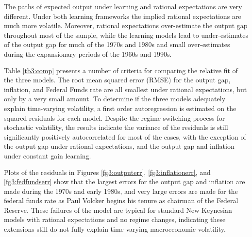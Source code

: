 The paths of expected output under learning and rational expectations are very different.  Under both learning frameworks the implied rational expectations are much more volatile.  Moreover, rational expectations over-estimate the output gap throughout most of the sample, while the learning models lead to under-estimates of the output gap for much of the 1970s and 1980s and small over-estimates during the expansionary periods of the 1960s and 1990s.

Table \ref{tb3:comp} presents a number of criteria for comparing the relative fit of the three models.  The root mean squared error (RMSE) for the output gap, inflation, and Federal Funds rate are all smallest under rational expectations, but only by a very small amount.  To determine if the three models adequately explain time-varying volatility, a first order autoregression is estimated on the squared residuals for each model.  Despite the regime switching process for stochastic volatility, the results indicate the variance of the residuals is still significantly positively autocorrelated for most of the cases, with the exception of the output gap under rational expectations, and the output gap and inflation under constant gain learning.

Plots of the residuals in Figures \ref{fg3:outputerr}, \ref{fg3:inflationerr}, and \ref{fg3:fedfundserr} show that the largest errors for the output gap and inflation are made during the 1970s and early 1980s, and very large errors are made for the federal funds rate as Paul Volcker begins his tenure as chairman of the Federal Reserve.  These failures of the model are typical for standard New Keynesian models with rational expectations and no regime changes, indicating these extensions still do not fully explain time-varying macroeconomic volatility.

